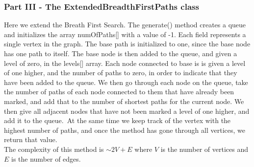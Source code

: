 \documentclass[11pt]{article}
\begin{document}
\subsubsection*{Part III - The ExtendedBreadthFirstPaths class}
Here we extend the Breath First Search. The generate() method creates a queue and initializes the array numOfPaths[] with a value of -1. Each field
represents a single vertex in the graph. The base path is initialized to one, since the base node has one path to itself. The base node is then added
to the queue, and given a level of zero, in the levels[] array. Each node connected to base is is given a level of one higher, and the number of paths to 
zero, in order to indicate that they have been added to the queue. We then go through each node on the queue, take the number of paths of each node connected to
them that have already been marked, and add that to the number of shortest paths for the current node. We then give all adjacent nodes that have not been marked 
a level of one higher, and add it to the queue. At the same time we keep track of the vertex with the highest number of paths, and once the method has gone through
all vertices, we return that value. \\
The complexity of this method is $\sim2V+E$ where $V$ is the number of vertices and $E$ is the number of edges.
\end{document}
